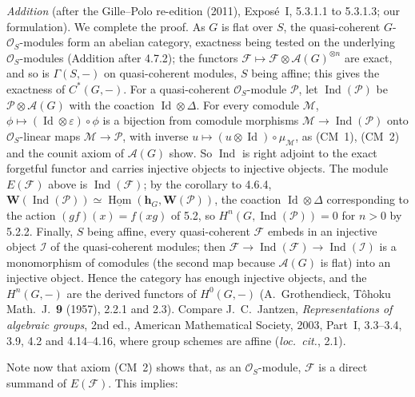 \par\medskip\noindent
\emph{Addition} (after the Gille--Polo re-edition (2011), Exposé~I, 5.3.1.1
to 5.3.1.3; our formulation). We complete the proof. As \(G\) is flat over
\(S\), the quasi-coherent \(G\)-\(\mathscr O_S\)-modules form an abelian
category, exactness being tested on the underlying \(\mathscr O_S\)-modules
(Addition after 4.7.2); the functors
\(\mathscr F\mapsto\mathscr F\otimes\mathscr A(G)^{\otimes n}\) are exact,
and so is \(\Gamma(S,-)\) on quasi-coherent modules, \(S\) being affine; this
gives the exactness of \(C^*(G,-)\). For a quasi-coherent
\(\mathscr O_S\)-module \(\mathscr P\), let \(\operatorname{Ind}(\mathscr P)\)
be \(\mathscr P\otimes\mathscr A(G)\) with the coaction
\(\operatorname{Id}\otimes\Delta\). For every comodule \(\mathscr M\),
\(\phi\mapsto(\operatorname{Id}\otimes\varepsilon)\circ\phi\) is a bijection
from comodule morphisms \(\mathscr M\to\operatorname{Ind}(\mathscr P)\) onto
\(\mathscr O_S\)-linear maps \(\mathscr M\to\mathscr P\), with inverse
\(u\mapsto(u\otimes\operatorname{Id})\circ\mu_{\mathscr M}\), as (CM~1),
(CM~2) and the counit axiom of \(\mathscr A(G)\) show. So
\(\operatorname{Ind}\) is right adjoint to the exact forgetful functor and
carries injective objects to injective objects. The module
\(E(\mathscr F)\) above is \(\operatorname{Ind}(\mathscr F)\); by the
corollary to 4.6.4,
\(\mathbf W(\operatorname{Ind}(\mathscr P))\simeq
\underline{\operatorname{Hom}}(\mathbf h_G,\mathbf W(\mathscr P))\), the
coaction \(\operatorname{Id}\otimes\Delta\) corresponding to the action
\((gf)(x)=f(xg)\) of 5.2, so \(H^n(G,\operatorname{Ind}(\mathscr P))=0\) for
\(n>0\) by 5.2.2. Finally, \(S\) being affine, every quasi-coherent
\(\mathscr F\) embeds in an injective object \(\mathscr I\) of the
quasi-coherent modules; then
\(\mathscr F\to\operatorname{Ind}(\mathscr F)\to\operatorname{Ind}(\mathscr I)\)
is a monomorphism of comodules (the second map because \(\mathscr A(G)\) is
flat) into an injective object. Hence the category has enough injective
objects, and the \(H^n(G,-)\) are the derived functors of \(H^0(G,-)\)
(A.~Grothendieck, Tôhoku Math.\ J.\ \textbf{9} (1957), 2.2.1 and 2.3).
Compare J.~C.~Jantzen,
\textit{Representations of algebraic groups}, 2nd ed., American
Mathematical Society, 2003, Part~I, 3.3--3.4, 3.9, 4.2 and 4.14--4.16,
where group schemes are affine (\textit{loc.\ cit.}, 2.1).
\par\medskip

Note now that axiom (CM~2) shows that, as an \(\mathscr O_S\)-module,
\(\mathscr F\) is a direct summand of \(E(\mathscr F)\). This implies:

